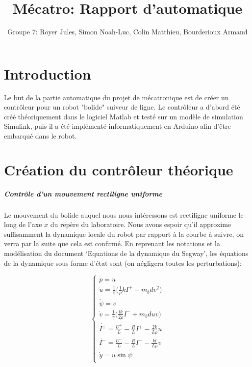 \documentclass{report}
\title{Mécatro: Rapport d'automatique}
\author{Groupe 7: Royer Jules, Simon Noah-Luc, Colin Matthieu, Bourderioux Armand}
\date{}
\begin{document}
\maketitle

\tableofcontents

\chapter{Introduction}
Le but de la partie automatique du projet de mécatronique est de créer un contrôleur
pour un robot "bolide" suiveur de ligne. Le contrôleur a d'abord été créé théoriquement
dans le logiciel Matlab et testé sur un modèle de simulation Simulink, puis il a été
implémenté informatiquement en Arduino afin d'être embarqué dans le robot.

\nopagebreak

\chapter{Création du contrôleur théorique}

\paragraph{Contrôle d'un mouvement rectiligne uniforme}

Le mouvement du bolide auquel nous nous intéressons est rectiligne uniforme le long de l'axe $x$ du repère du laboratoire.
Nous avons espoir qu'il approxime suffisamment la dynamique locale du robot par rapport à la courbe à suivre, on
verra par la suite que cela est confirmé.
En reprenant les notations et la modélisation du document `Equations de la dynamique du Segway',
les équations de la dynamique sous forme d'état sont (on négligera toutes les perturbations):

\begin{equation*}
    \begin{cases}
        \dot{p} = u \\
        \dot{u} = \frac{1}{\beta}\big( \frac{1}{\rho}kI^{+} - m_bdv^2 \big) \\
        \dot{\psi} = v \\
        \dot{v} = \frac{1}{\gamma}\big( \frac{lk}{2\rho}I^{-} + m_bduv \big) \\
        \dot{I^{+}} = \frac{U^{+}}{L} - \frac{R}{L}I^{+} - \frac{2k}{L\rho}u \\
        \dot{I^{-}} = \frac{U^{-}}{L} - \frac{R}{L}I^{-} - \frac{kl}{L\rho}v \\
        \dot{y} = u\sin\psi \\
    \end{cases}
\end{equation*}
\end{document}
